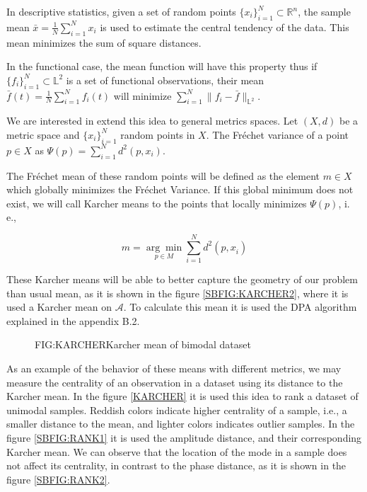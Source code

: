 In descriptive statistics, given a set of random points
$\{x_i\}_{i=1}^{N} \subset \mathbb{R}^n$, the sample mean
$\bar x = \frac{1}{N}\sum_{i=1}^{N} x_i$ is used to estimate the central
tendency of the data. This mean minimizes the sum of square distances.

In the functional case, the mean function will have this property thus if
$\{f_i\}_{i=1}^{N} \subset \mathbb{L}^2$ is a set of functional observations,
their mean $\bar f(t) = \frac{1}{N}\sum_{i=1}^{N} f_i(t)$ will minimize
$\sum_{i=1}^{N}\|f_i - \bar f\|_{\mathbb{L}^2}$.

We are interested in extend this idea to general metrics spaces.
Let $(X, d)$ be a metric space and $\{x_i\}_{i=1}^{N}$ random points in $X$.
The Fréchet variance of a point $p \in X$ as $\Psi(p)=\sum_{i=1}^{N} d^{2}\left(p, x_{i}\right)$.

The Fréchet mean of these random points will be defined as the element $m \in X$
which globally minimizes the Fréchet Variance. If this global minimum does not
exist, we will call Karcher means to the points that locally minimizes
$\Psi(p)$, i. e.,

$$
m=\underset{p \in M}{\arg \min } \sum_{i=1}^{N} d^{2}\left(p, x_{\dot{i}}\right)
$$

These Karcher means will be able to better capture the geometry of our problem
than usual mean, as it is shown in the figure \ref{SBFIG:KARCHER2}, where it is
used a Karcher mean on $\mathscr{A}$. To calculate this mean it is used the DPA algorithm explained in the appendix B.2.

\begin{figure}[Karcher mean of bimodal dataset]{FIG:KARCHER}{Karcher mean of bimodal dataset}
   \quad
   \\
   \quad
\end{figure}

As an example of the behavior of these means with different metrics, we may
measure the centrality of an observation in a dataset using its distance to the
Karcher mean. In the figure \ref{KARCHER} it is used this idea to rank a dataset of
unimodal samples. Reddish colors indicate higher centrality of a sample, i.e.,
a smaller distance to the mean, and lighter colors indicates outlier samples.
In the figure \ref{SBFIG:RANK1} it is used the amplitude distance, and their
corresponding Karcher mean. We can observe that the location of the mode in a
sample does not affect its centrality, in contrast to the phase distance,
as it is shown in the figure \ref{SBFIG:RANK2}.
